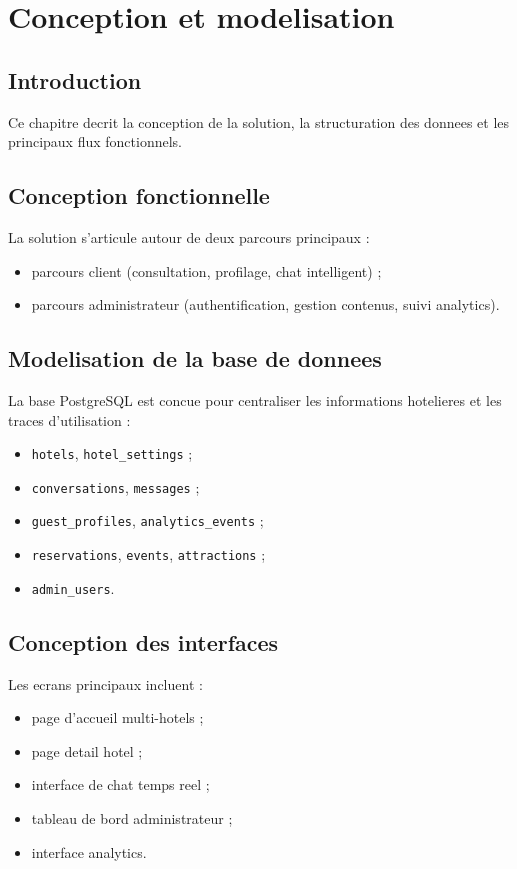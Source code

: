 \chapter{Conception et modelisation}

\section{Introduction}
Ce chapitre decrit la conception de la solution, la structuration des donnees et les principaux flux fonctionnels.

\section{Conception fonctionnelle}
La solution s'articule autour de deux parcours principaux :
\begin{itemize}
  \item parcours client (consultation, profilage, chat intelligent) ;
  \item parcours administrateur (authentification, gestion contenus, suivi analytics).
\end{itemize}

\section{Modelisation de la base de donnees}
La base PostgreSQL est concue pour centraliser les informations hotelieres et les traces d'utilisation :
\begin{itemize}
  \item \texttt{hotels}, \texttt{hotel\_settings} ;
  \item \texttt{conversations}, \texttt{messages} ;
  \item \texttt{guest\_profiles}, \texttt{analytics\_events} ;
  \item \texttt{reservations}, \texttt{events}, \texttt{attractions} ;
  \item \texttt{admin\_users}.
\end{itemize}

\section{Conception des interfaces}
Les ecrans principaux incluent :
\begin{itemize}
  \item page d'accueil multi-hotels ;
  \item page detail hotel ;
  \item interface de chat temps reel ;
  \item tableau de bord administrateur ;
  \item interface analytics.
\end{itemize}

